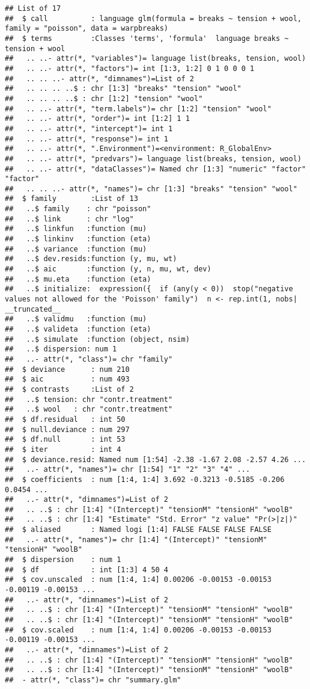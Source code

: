 \documentclass[
  oneside]{book}
\begin{document}
\begin{verbatim}
## List of 17
##  $ call          : language glm(formula = breaks ~ tension + wool, family = "poisson", data = warpbreaks)
##  $ terms         :Classes 'terms', 'formula'  language breaks ~ tension + wool
##   .. ..- attr(*, "variables")= language list(breaks, tension, wool)
##   .. ..- attr(*, "factors")= int [1:3, 1:2] 0 1 0 0 0 1
##   .. .. ..- attr(*, "dimnames")=List of 2
##   .. .. .. ..$ : chr [1:3] "breaks" "tension" "wool"
##   .. .. .. ..$ : chr [1:2] "tension" "wool"
##   .. ..- attr(*, "term.labels")= chr [1:2] "tension" "wool"
##   .. ..- attr(*, "order")= int [1:2] 1 1
##   .. ..- attr(*, "intercept")= int 1
##   .. ..- attr(*, "response")= int 1
##   .. ..- attr(*, ".Environment")=<environment: R_GlobalEnv> 
##   .. ..- attr(*, "predvars")= language list(breaks, tension, wool)
##   .. ..- attr(*, "dataClasses")= Named chr [1:3] "numeric" "factor" "factor"
##   .. .. ..- attr(*, "names")= chr [1:3] "breaks" "tension" "wool"
##  $ family        :List of 13
##   ..$ family    : chr "poisson"
##   ..$ link      : chr "log"
##   ..$ linkfun   :function (mu)  
##   ..$ linkinv   :function (eta)  
##   ..$ variance  :function (mu)  
##   ..$ dev.resids:function (y, mu, wt)  
##   ..$ aic       :function (y, n, mu, wt, dev)  
##   ..$ mu.eta    :function (eta)  
##   ..$ initialize:  expression({  if (any(y < 0))  stop("negative values not allowed for the 'Poisson' family")  n <- rep.int(1, nobs| __truncated__
##   ..$ validmu   :function (mu)  
##   ..$ valideta  :function (eta)  
##   ..$ simulate  :function (object, nsim)  
##   ..$ dispersion: num 1
##   ..- attr(*, "class")= chr "family"
##  $ deviance      : num 210
##  $ aic           : num 493
##  $ contrasts     :List of 2
##   ..$ tension: chr "contr.treatment"
##   ..$ wool   : chr "contr.treatment"
##  $ df.residual   : int 50
##  $ null.deviance : num 297
##  $ df.null       : int 53
##  $ iter          : int 4
##  $ deviance.resid: Named num [1:54] -2.38 -1.67 2.08 -2.57 4.26 ...
##   ..- attr(*, "names")= chr [1:54] "1" "2" "3" "4" ...
##  $ coefficients  : num [1:4, 1:4] 3.692 -0.3213 -0.5185 -0.206 0.0454 ...
##   ..- attr(*, "dimnames")=List of 2
##   .. ..$ : chr [1:4] "(Intercept)" "tensionM" "tensionH" "woolB"
##   .. ..$ : chr [1:4] "Estimate" "Std. Error" "z value" "Pr(>|z|)"
##  $ aliased       : Named logi [1:4] FALSE FALSE FALSE FALSE
##   ..- attr(*, "names")= chr [1:4] "(Intercept)" "tensionM" "tensionH" "woolB"
##  $ dispersion    : num 1
##  $ df            : int [1:3] 4 50 4
##  $ cov.unscaled  : num [1:4, 1:4] 0.00206 -0.00153 -0.00153 -0.00119 -0.00153 ...
##   ..- attr(*, "dimnames")=List of 2
##   .. ..$ : chr [1:4] "(Intercept)" "tensionM" "tensionH" "woolB"
##   .. ..$ : chr [1:4] "(Intercept)" "tensionM" "tensionH" "woolB"
##  $ cov.scaled    : num [1:4, 1:4] 0.00206 -0.00153 -0.00153 -0.00119 -0.00153 ...
##   ..- attr(*, "dimnames")=List of 2
##   .. ..$ : chr [1:4] "(Intercept)" "tensionM" "tensionH" "woolB"
##   .. ..$ : chr [1:4] "(Intercept)" "tensionM" "tensionH" "woolB"
##  - attr(*, "class")= chr "summary.glm"
\end{verbatim}
\end{document}
